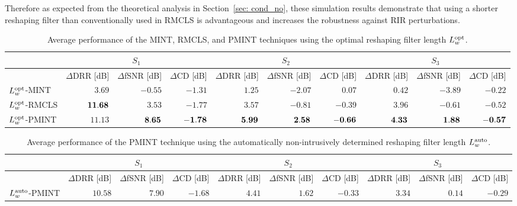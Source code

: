 \documentclass[twocolumn]{bmcart}%
\begin{document}
Therefore as expected from the theoretical analysis in Section~\ref{sec: cond_no}, these simulation results demonstrate that using a shorter reshaping filter than conventionally used in RMCLS is advantageous and increases the robustness against RIR perturbations.
\begin{table*}[t!]
\def\tabcolsep{3pt}
\begin{center}
  \caption{Average performance of the MINT, RMCLS, and PMINT techniques using the optimal reshaping filter length $L^{\rm opt}_w$.}
  \label{tbl: opt_Lw}
  \begin{tabularx}{\linewidth}{Xrrrrrrrrr}
    \toprule
    & \multicolumn{3}{c}{$S_1$} & \multicolumn{3}{c}{$S_2$} & \multicolumn{3}{c}{$S_3$} \\
    \midrule
      & $\Delta$DRR [dB] & $\Delta$fSNR [dB] & $\Delta$CD [dB] & $\Delta$DRR [dB] & $\Delta$fSNR [dB] & $\Delta$CD [dB] & $\Delta$DRR [dB] & $\Delta$fSNR [dB] & $\Delta$CD [dB] \\
    \midrule
       $L^{\rm opt}_{w}$-MINT & $3.69$ & $-0.55$ & $-1.31$ & $1.25$ & $-2.07$ & $0.07$ & $0.42$ & $-3.89$ & $-0.22$ \\
       $L^{\rm opt}_{w}$-RMCLS & $\bf{11.68}$ & $3.53$ & $-1.77$ & $3.57$ & $-0.81$ & $-0.39$ & $3.96$ & $-0.61$ & $-0.52$\\
       $L^{\rm opt}_{w}$-PMINT & $11.13$ & $\bf{8.65}$ & $\bf{-1.78}$ & $\bf{5.99}$ & $\bf{2.58}$ & $\bf{-0.66}$ & $\bf{4.33}$ & $\bf{1.88}$ & $\bf{-0.57}$ \\
    \bottomrule
  \end{tabularx}
\end{center}
\end{table*}
\begin{table*}[t!]
\def\tabcolsep{3pt}
\begin{center}
  \caption{Average performance of the PMINT technique using the automatically non-intrusively determined reshaping filter length $L^{\rm auto}_w$.}
  \label{tbl: auto_Lw}
  \begin{tabularx}{\linewidth}{Xrrrrrrrrr}
    \toprule
    & \multicolumn{3}{c}{$S_1$} & \multicolumn{3}{c}{$S_2$} & \multicolumn{3}{c}{$S_3$} \\
    \midrule
      & $\Delta$DRR [dB] & $\Delta$fSNR [dB] & $\Delta$CD [dB] & $\Delta$DRR [dB] & $\Delta$fSNR [dB] & $\Delta$CD [dB] & $\Delta$DRR [dB] & $\Delta$fSNR [dB] & $\Delta$CD [dB] \\
    \midrule
       $L^{\rm auto}_{w}$-PMINT & $10.58$ & $7.90$ & $-1.68$ & $4.41$ & $1.62$ & $-0.33$ & $3.34$ & $0.14$ & $-0.29$ \\
    \bottomrule
  \end{tabularx}
\end{center}
\end{table*}
\end{document}
